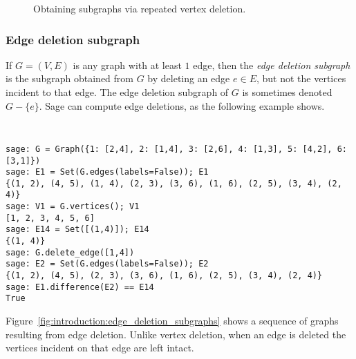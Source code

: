 \begin{figure}[!htbp]
{
}
%
\caption{Obtaining subgraphs via repeated vertex deletion.}
\label{fig:introduction:vertex_deletion_subgraphs}
\end{figure}



\subsubsection{Edge deletion subgraph}

If $G = (V,E)$ is any graph with at least $1$ edge, then the
\emph{edge deletion subgraph} is the subgraph obtained from $G$ by
deleting an edge $e \in E$, but not the vertices incident to that edge.
The edge deletion subgraph of $G$ is sometimes denoted $G - \{e\}$.
Sage can compute edge deletions, as the following example shows.
%
\begin{center}
\fontsize{9pt}{9pt}
\selectfont
\tt
\begin{lstlisting}
sage: G = Graph({1: [2,4], 2: [1,4], 3: [2,6], 4: [1,3], 5: [4,2], 6: [3,1]})
sage: E1 = Set(G.edges(labels=False)); E1
{(1, 2), (4, 5), (1, 4), (2, 3), (3, 6), (1, 6), (2, 5), (3, 4), (2, 4)}
sage: V1 = G.vertices(); V1
[1, 2, 3, 4, 5, 6]
sage: E14 = Set([(1,4)]); E14
{(1, 4)}
sage: G.delete_edge([1,4])
sage: E2 = Set(G.edges(labels=False)); E2
{(1, 2), (4, 5), (2, 3), (3, 6), (1, 6), (2, 5), (3, 4), (2, 4)}
sage: E1.difference(E2) == E14
True
\end{lstlisting}
\end{center}
%
Figure~\ref{fig:introduction:edge_deletion_subgraphs} shows a sequence
of graphs resulting from edge deletion. Unlike vertex deletion, when
an edge is deleted the vertices incident on that edge are left
intact.

